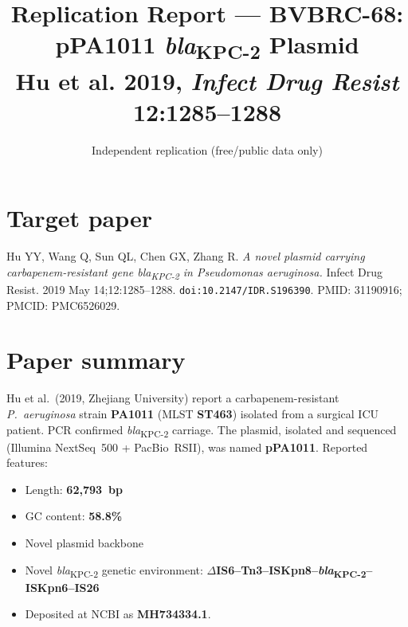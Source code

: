 \documentclass[11pt]{article}
\title{Replication Report --- BVBRC-68: pPA1011 \textit{bla}\textsubscript{KPC-2} Plasmid \\
       \large Hu et al. 2019, \textit{Infect Drug Resist} 12:1285--1288}
\author{Independent replication (free/public data only)}
\date{}
\begin{document}
\maketitle

\begin{center}
\end{center}

\section{Target paper}
Hu YY, Wang Q, Sun QL, Chen GX, Zhang R. \emph{A novel plasmid carrying carbapenem-resistant gene bla\textsubscript{KPC-2} in Pseudomonas aeruginosa.} Infect Drug Resist. 2019 May 14;12:1285--1288. \texttt{doi:10.2147/IDR.S196390}. PMID: 31190916; PMCID: PMC6526029.

\section{Paper summary}
Hu et al.\ (2019, Zhejiang University) report a carbapenem-resistant \textit{P.~aeruginosa} strain \textbf{PA1011} (MLST \textbf{ST463}) isolated from a surgical ICU patient. PCR confirmed \textit{bla}\textsubscript{KPC-2} carriage. The plasmid, isolated and sequenced (Illumina NextSeq~500 + PacBio~RSII), was named \textbf{pPA1011}. Reported features:
\begin{itemize}[nosep]
  \item Length: \textbf{62{,}793~bp}
  \item GC content: \textbf{58.8\%}
  \item Novel plasmid backbone
  \item Novel \textit{bla}\textsubscript{KPC-2} genetic environment: \textbf{$\Delta$IS6--Tn3--ISKpn8--\textit{bla}\textsubscript{KPC-2}--ISKpn6--IS26}
  \item Deposited at NCBI as \textbf{MH734334.1}.
\end{itemize}
\end{document}
